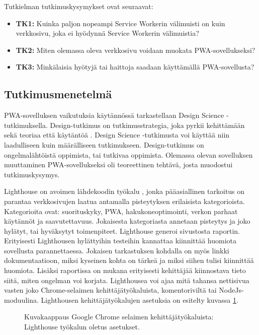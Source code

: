 \documentclass{tktltiki}
\begin{document}
Tutkielman tutkimuskysymykset ovat seuraavat:

\begin{itemize}
  \item \textbf{TK1:} Kuinka paljon nopeampi Service Workerin välimuisti on kuin verkkosivu, joka ei hyödynnä Service Workerin välimuistia?
  \item \textbf{TK2:} Miten olemassa oleva verkkosivu voidaan muokata PWA-sovellukseksi?
  \item \textbf{TK3:} Minkälaisia hyötyjä tai haittoja saadaan käyttämällä PWA-sovellusta?
\end{itemize}

\subsection{Tutkimusmenetelmä}

PWA-sovelluksen vaikutuksia käytännössä tarkastellaan Design Science -tutkimuksella. Design-tutkimus on tutkimusstrategia, joka pyrkii kehittämään sekä teoriaa että käytäntöä \cite{wieringa2010design}. Design Science -tutkimusta voi käyttää niin laadulliseen kuin määrälliseen tutkimukseen. Design-tutkimus on ongelmalähtöistä oppimista, tai tutkivaa oppimista. Olemassa olevan sovelluksen muuttaminen PWA-sovellukseksi oli teoreettinen tehtävä, josta muodostui tutkimuskysymys. 

Lighthouse on avoimen lähdekoodin työkalu \cite{Google2}, jonka pääasiallinen tarkoitus on parantaa verkkosivujen laatua antamalla pisteytyksen erilaisista kategorioista. Kategorioita ovat: suorituskyky, PWA, hakukoneoptimointi, verkon parhaat käytännöt ja saavutettavuus. Jokaisesta kategoriasta annetaan pisteytys ja joko hylätyt, tai hyväksytyt toimenpiteet. Lighthouse generoi sivustosta raportin. Erityisesti Lighthousen hylättyihin testeihin kannattaa kiinnittää huomiota sovellusta parannettaessa. Jokaisen tarkastuksen kohdalla on myös linkki dokumentaatioon, miksi kyseinen kohta on tärkeä ja miksi siihen tulisi kiinnittää huomiota. Lisäksi raportissa on mukana erityisesti kehittäjää kiinnostava tieto siitä, miten ongelman voi korjata. Lighthousea voi ajaa mitä tahansa nettisivua vasten joko Chrome-selaimen kehittäjätyökaluista, komentoriviltä tai NodeJs-moduulina. Lighthousen kehittäjätyökalujen asetuksia on esitelty kuvassa \ref{Lighthouse}.

\begin{figure}[h]
\begin{center}
\caption{Kuvakaappaus Google Chrome selaimen kehittäjätyökaluista: Lighthouse työkalun oletus asetukset.}
\label{Lighthouse}
\end{center}
\end{figure}
\end{document}
